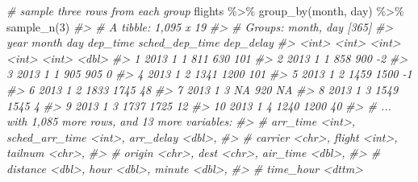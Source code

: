 \documentclass[
]{book}
\newenvironment{Shaded}{\begin{snugshade}}{\end{snugshade}}
\newcommand{\CommentTok}[1]{\textcolor[rgb]{0.56,0.35,0.01}{\textit{#1}}}
\newcommand{\DecValTok}[1]{\textcolor[rgb]{0.00,0.00,0.81}{#1}}
\newcommand{\FunctionTok}[1]{\textcolor[rgb]{0.00,0.00,0.00}{#1}}
\newcommand{\NormalTok}[1]{#1}
\newcommand{\SpecialCharTok}[1]{\textcolor[rgb]{0.00,0.00,0.00}{#1}}
\begin{document}
\begin{Shaded}
\begin{Highlighting}[]
\CommentTok{\# sample three rows from each group}
\NormalTok{flights }\SpecialCharTok{\%\textgreater{}\%} \FunctionTok{group\_by}\NormalTok{(month, day) }\SpecialCharTok{\%\textgreater{}\%} \FunctionTok{sample\_n}\NormalTok{(}\DecValTok{3}\NormalTok{)}
\CommentTok{\#\textgreater{} \# A tibble: 1,095 x 19}
\CommentTok{\#\textgreater{} \# Groups:   month, day [365]}
\CommentTok{\#\textgreater{}     year month   day dep\_time sched\_dep\_time dep\_delay}
\CommentTok{\#\textgreater{}    \textless{}int\textgreater{} \textless{}int\textgreater{} \textless{}int\textgreater{}    \textless{}int\textgreater{}          \textless{}int\textgreater{}     \textless{}dbl\textgreater{}}
\CommentTok{\#\textgreater{}  1  2013     1     1      811            630       101}
\CommentTok{\#\textgreater{}  2  2013     1     1      858            900        {-}2}
\CommentTok{\#\textgreater{}  3  2013     1     1      905            905         0}
\CommentTok{\#\textgreater{}  4  2013     1     2     1341           1200       101}
\CommentTok{\#\textgreater{}  5  2013     1     2     1459           1500        {-}1}
\CommentTok{\#\textgreater{}  6  2013     1     2     1833           1745        48}
\CommentTok{\#\textgreater{}  7  2013     1     3       NA            920        NA}
\CommentTok{\#\textgreater{}  8  2013     1     3     1549           1545         4}
\CommentTok{\#\textgreater{}  9  2013     1     3     1737           1725        12}
\CommentTok{\#\textgreater{} 10  2013     1     4     1240           1200        40}
\CommentTok{\#\textgreater{} \# ... with 1,085 more rows, and 13 more variables:}
\CommentTok{\#\textgreater{} \#   arr\_time \textless{}int\textgreater{}, sched\_arr\_time \textless{}int\textgreater{}, arr\_delay \textless{}dbl\textgreater{},}
\CommentTok{\#\textgreater{} \#   carrier \textless{}chr\textgreater{}, flight \textless{}int\textgreater{}, tailnum \textless{}chr\textgreater{},}
\CommentTok{\#\textgreater{} \#   origin \textless{}chr\textgreater{}, dest \textless{}chr\textgreater{}, air\_time \textless{}dbl\textgreater{},}
\CommentTok{\#\textgreater{} \#   distance \textless{}dbl\textgreater{}, hour \textless{}dbl\textgreater{}, minute \textless{}dbl\textgreater{},}
\CommentTok{\#\textgreater{} \#   time\_hour \textless{}dttm\textgreater{}}


\end{Highlighting}
\end{Shaded}
\end{document}
